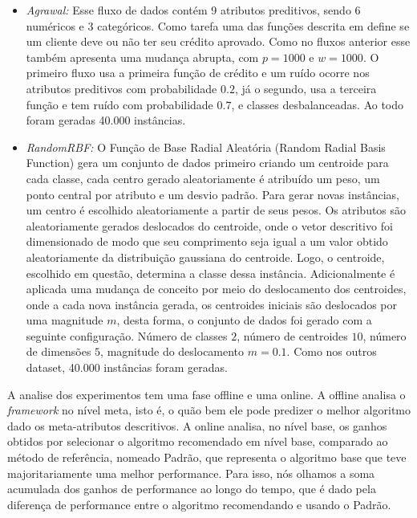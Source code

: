 \begin{itemize}
\item{\textit{Agrawal:}} Esse fluxo de dados contém 9 atributos preditivos, sendo 6 numéricos e
3 categóricos. Como tarefa uma das funções descrita em \cite{agrawal1993database} define se
um cliente deve ou não ter seu crédito aprovado. Como no fluxos anterior esse também apresenta
uma mudança abrupta, com $p=1000$ e $w=1000$. O primeiro fluxo usa a primeira função de crédito
e um ruído ocorre nos atributos preditivos com probabilidade $0.2$, já o segundo, usa a terceira
função e tem ruído com probabilidade $0.7$, e classes desbalanceadas. Ao todo foram geradas
40.000 instâncias.

\item{\textit{RandomRBF:}} O Função de Base Radial Aleatória (Random Radial Basis Function)
gera um conjunto de dados primeiro criando um centroide para cada classe, cada centro gerado
aleatoriamente é atribuído um peso, um ponto central por atributo e um desvio padrão. Para
gerar novas instâncias, um centro é escolhido aleatoriamente a partir de seus pesos. Os
atributos são aleatoriamente gerados deslocados do centroide, onde o vetor descritivo foi
dimensionado de modo que seu comprimento seja igual a um valor obtido aleatoriamente da
distribuição gaussiana do centroide. Logo, o centroide, escolhido em questão, determina a
classe dessa instância. Adicionalmente é aplicada uma mudança de conceito por meio do
deslocamento dos centroides, onde a cada nova instância gerada, os centroides iniciais
são deslocados por uma magnitude $m$, desta forma, o conjunto de dados foi gerado com a
seguinte configuração. Número de classes $2$, número de centroides $10$, número de dimensões
$5$, magnitude do deslocamento $m=0.1$. Como nos outros dataset, 40.000 instâncias foram
geradas.
\end{itemize}

A analise dos experimentos tem uma fase offline e uma online. A offline analisa o 
\textit{framework} no nível meta, isto é, o quão bem ele pode predizer o melhor algoritmo
dado os meta-atributos descritivos. A online analisa, no nível base, os ganhos obtidos por
selecionar o algoritmo recomendado em nível base, comparado ao método de referência, nomeado
Padrão, que representa o algoritmo base que teve majoritariamente uma melhor performance.
Para isso, nós olhamos a soma acumulada dos ganhos de performance ao longo do tempo, que é dado
pela diferença de performance entre o algoritmo recomendando e usando o Padrão.